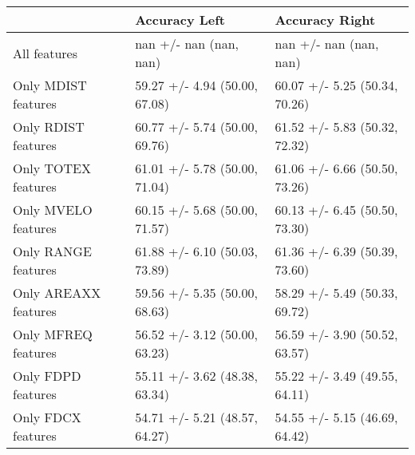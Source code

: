 \begin{tabular}{lll}
\toprule
{} &                  Accuracy Left &                 Accuracy Right \\
\midrule
All features         &         nan +/- nan (nan, nan) &         nan +/- nan (nan, nan) \\
Only MDIST features  &  59.27 +/- 4.94 (50.00, 67.08) &  60.07 +/- 5.25 (50.34, 70.26) \\
Only RDIST features  &  60.77 +/- 5.74 (50.00, 69.76) &  61.52 +/- 5.83 (50.32, 72.32) \\
Only TOTEX features  &  61.01 +/- 5.78 (50.00, 71.04) &  61.06 +/- 6.66 (50.50, 73.26) \\
Only MVELO features  &  60.15 +/- 5.68 (50.00, 71.57) &  60.13 +/- 6.45 (50.50, 73.30) \\
Only RANGE features  &  61.88 +/- 6.10 (50.03, 73.89) &  61.36 +/- 6.39 (50.39, 73.60) \\
Only AREAXX features &  59.56 +/- 5.35 (50.00, 68.63) &  58.29 +/- 5.49 (50.33, 69.72) \\
Only MFREQ features  &  56.52 +/- 3.12 (50.00, 63.23) &  56.59 +/- 3.90 (50.52, 63.57) \\
Only FDPD features   &  55.11 +/- 3.62 (48.38, 63.34) &  55.22 +/- 3.49 (49.55, 64.11) \\
Only FDCX features   &  54.71 +/- 5.21 (48.57, 64.27) &  54.55 +/- 5.15 (46.69, 64.42) \\
\bottomrule
\end{tabular}
